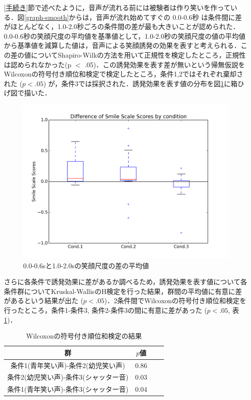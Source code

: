 \documentclass[report,10pt,uplatex,titlepage]{jsarticle}
\begin{document}
\ref{手続き}節で述べたように，音声が流れる前には被験者は作り笑いを作っている．図\ref{graph-smooth}からは，音声が流れ始めてすぐの 0.0-0.6秒 は条件間に差がほとんどなく，1.0-2.0秒ごろの条件間の差が最も大きいことが認められた．0.0-0.6秒の笑顔尺度の平均値を基準値として，1.0-2.0秒の笑顔尺度の値の平均値から基準値を減算した値は，音声による笑顔誘発の効果を表すと考えられる．この差の値についてShapiro-Wilkの方法を用いて正規性を検定したところ，正規性は認められなかった(p $<$ .05)．この誘発効果を表す差が無いという帰無仮説をWilcoxonの符号付き順位和検定で検定したところ，条件1,2ではそれぞれ棄却された ($p<.05$) が，条件3では採択された．誘発効果を表す値の分布を図\ref{graph-diff}に箱ひげ図で描いた．

\begin{figure}[h!]
  \centering
\includegraphics[width=140mm, bb=0 0 600 450]{images/graph-diff.png}
\caption{0.0-0.6sと1.0-2.0sの笑顔尺度の差の平均値}
  \label{graph-diff}
\end{figure}


さらに各条件で誘発効果に差があるか調べるため，誘発効果を表す値について各条件群についてKruskal-WallisのH検定を行った結果，群間の平均値に有意に差があるという結果が出た ($p<.05$)．2条件間でWilcoxonの符号付き順位和検定を行ったところ，条件1-条件3, 条件2-条件3の間に有意に差があった ($p<.05$, 表\ref{anova-p})．

\break
\begin{table}[htb]
  \begin{center}
    \caption{Wilcoxonの符号付き順位和検定の結果}
    \begin{tabular}{|c|c|r||r|} \hline
      群 & $p$値  \\ \hline  \hline
      条件1(青年笑い声)-条件2(幼児笑い声) & $0.86$ \\ \hline
      条件2(幼児笑い声)-条件3(シャッター音) & $0.03$ \\ \hline
      条件1(青年笑い声)-条件3(シャッター音) & $0.04$ \\ \hline
    \end{tabular}
    \label{anova-p}
  \end{center}
\end{table}
\end{document}
